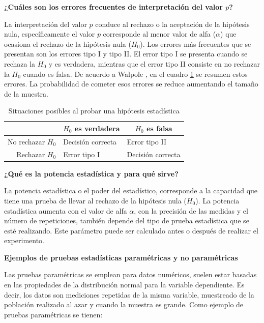 \documentclass{article}
\begin{document}
\noindent \textbf{¿Cuáles son los errores frecuentes de interpretación del valor $p$?}
    
La interpretación del valor $p$ conduce al rechazo o la aceptación de la hipótesis nula, específicamente el valor $p$ corresponde al menor valor de alfa ($\alpha$) que ocasiona el rechazo de la hipótesis nula ($H_{0}$). Los errores más frecuentes que se presentan son los errores tipo I y tipo II. El error tipo I se presenta cuando se rechaza la $H_{0}$ y es verdadera, mientras que el error tipo II consiste en no rechazar la $H_{0}$ cuando es falsa. De acuerdo a Walpole \cite{walpole}, en el cuadro \ref{errores} se resumen estos errores. La probabilidad de cometer esos errores se reduce aumentando el tamaño de la muestra.
    
    \begin{table}
    \centering
    \caption{Situaciones posibles al probar una hipótesis estadística}
  \begin{tabular}{|r|l|l|}
    \hline
    \multicolumn{1}{|c|}{} & \multicolumn{1}{c|}{$H_{0}$ es verdadera} & \multicolumn{1}{c|}{$H_{0}$ es falsa} \\ \hline
    No rechazar $H_{0}$    & Decisión correcta                         & Error tipo II                         \\ \hline
    Rechazar $H_{0}$       & Error tipo I                              & Decisión correcta                     \\ \hline 
    \end{tabular}
    \label{errores}
    \end{table}

\noindent \textbf{¿Qué es la potencia estadística y para qué sirve?}
    
La potencia estadística o el poder del estadístico, corresponde a la capacidad que tiene una prueba de llevar al rechazo de la hipótesis nula ($H_{0}$). La potencia estadística aumenta con el valor de alfa $\alpha$, con la precisión de las medidas y el número de repeticiones, también depende del tipo de prueba estadística que se esté realizando. Este parámetro puede ser calculado antes o después de realizar el experimento.
    
\noindent \textbf{Ejemplos de pruebas estadísticas paramétricas y no paramétricas}
    
Las pruebas paramétricas se emplean para datos numéricos, suelen estar basadas en las propiedades de la distribución normal para la variable dependiente. Es decir, los datos son mediciones repetidas de la misma variable, muestreado de la población realizado al azar y cuando la muestra es grande. Como ejemplo de pruebas paramétricas se tienen: 
    
\end{document}
